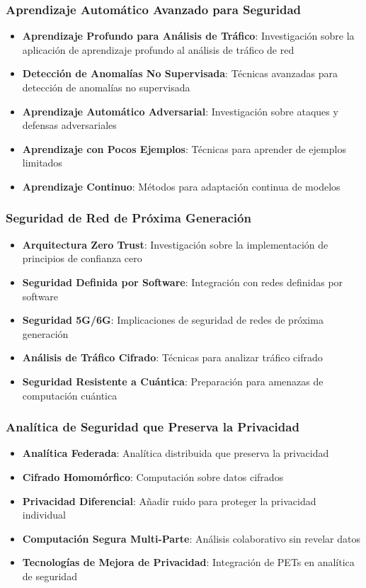 \subsubsection{Aprendizaje Automático Avanzado para Seguridad}
\begin{itemize}
    \item \textbf{Aprendizaje Profundo para Análisis de Tráfico}: Investigación sobre la aplicación de aprendizaje profundo al análisis de tráfico de red
    \item \textbf{Detección de Anomalías No Supervisada}: Técnicas avanzadas para detección de anomalías no supervisada
    \item \textbf{Aprendizaje Automático Adversarial}: Investigación sobre ataques y defensas adversariales
    \item \textbf{Aprendizaje con Pocos Ejemplos}: Técnicas para aprender de ejemplos limitados
    \item \textbf{Aprendizaje Continuo}: Métodos para adaptación continua de modelos
\end{itemize}

\subsubsection{Seguridad de Red de Próxima Generación}
\begin{itemize}
    \item \textbf{Arquitectura Zero Trust}: Investigación sobre la implementación de principios de confianza cero
    \item \textbf{Seguridad Definida por Software}: Integración con redes definidas por software
    \item \textbf{Seguridad 5G/6G}: Implicaciones de seguridad de redes de próxima generación
    \item \textbf{Análisis de Tráfico Cifrado}: Técnicas para analizar tráfico cifrado
    \item \textbf{Seguridad Resistente a Cuántica}: Preparación para amenazas de computación cuántica
\end{itemize}

\subsubsection{Analítica de Seguridad que Preserva la Privacidad}
\begin{itemize}
    \item \textbf{Analítica Federada}: Analítica distribuida que preserva la privacidad
    \item \textbf{Cifrado Homomórfico}: Computación sobre datos cifrados
    \item \textbf{Privacidad Diferencial}: Añadir ruido para proteger la privacidad individual
    \item \textbf{Computación Segura Multi-Parte}: Análisis colaborativo sin revelar datos
    \item \textbf{Tecnologías de Mejora de Privacidad}: Integración de PETs en analítica de seguridad
\end{itemize}

